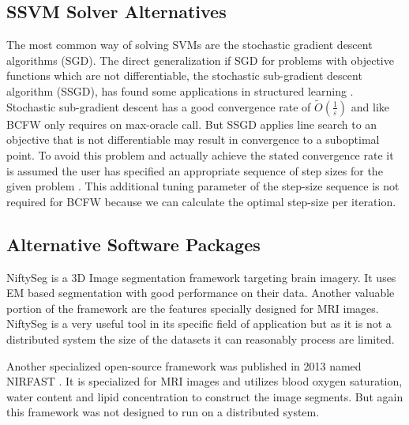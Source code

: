 \subsection{SSVM Solver Alternatives}

The most common way of solving SVMs are the stochastic gradient descent algorithms (SGD). The direct generalization if SGD for problems with objective functions which are not differentiable, the stochastic sub-gradient descent algorithm (SSGD), has found some applications in structured learning \cite{ratliff2007approximate} \cite{tsochantaridis2005large} \cite{roller2004max}. Stochastic sub-gradient descent has a good convergence rate of $\tilde{O}(\frac{1}{\varepsilon})$ and like BCFW only requires on max-oracle call. But SSGD applies line search to an objective that is not differentiable may result in convergence to a suboptimal point. To avoid this problem and actually achieve the stated convergence rate it is assumed the user has specified an appropriate sequence of step sizes for the given problem \cite{ratliff2007approximate}. This additional tuning parameter of the step-size sequence is not required for BCFW because we can calculate the optimal step-size per iteration. 

\subsection{Alternative Software Packages}
NiftySeg is a 3D Image segmentation framework targeting brain imagery. It uses EM based segmentation with good performance on their data. Another valuable portion of the framework are the features specially designed for MRI images\cite{cardoso2011niftyseg}. NiftySeg is a very useful tool in its specific field of application but as it is not a distributed system the size of the datasets it can reasonably process are limited. 
\par
Another specialized open-source framework was published in 2013 named NIRFAST \cite{jermyn2013fast}. It is specialized for MRI images and utilizes blood oxygen saturation, water content and lipid concentration to construct the image segments. But again this framework was not designed to run on a distributed system. 